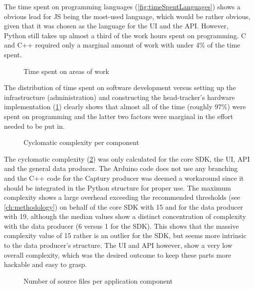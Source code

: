 The time spent on programming languages (\ref{fig:timeSpentLanguages}) shows a obvious lead for \ac{JS} being the most-used language, which would be rather obvious, given that it was chosen as the language for the \ac{UI} and the \ac{API}. However, Python still takes up almost a third of the work hours spent on programming. C and C++ required only a marginal amount of work with under 4\% of the time spent.

\begin{figure}[h]
\centering

\caption[Time spent on areas of work]{Time spent on areas of work\protect}
\label{fig:timeSpentTypeOfWork}
\end{figure}

The distribution of time spent on software development versus setting up the infrastructure (administration) and constructing the head-tracker's hardware implementation (\ref{fig:timeSpentTypeOfWork}) clearly shows that almost all of the time (roughly 97\%) were spent on programming and the latter two factors were marginal in the effort needed to be put in.

\begin{figure}[h]
\centering

\caption[Cyclomatic complexity]{Cyclomatic complexity per component\protect}
\label{fig:cyclomaticComplexity}
\end{figure}

The cyclomatic complexity (\ref{fig:cyclomaticComplexity}) was only calculated for the core \ac{SDK}, the \ac{UI}, \ac{API} and the general data producer. The Arduino code does not use any branching and the C++ code for the Captury producer was deemed a workaround since it should be integrated in the Python structure for proper use. The maximum complexity shows a large overhead exceeding the recommended thresholds (see \autoref{ch:methodology}) on behalf of the core \ac{SDK} with 15 and for the data producer with 19, although the median values show a distinct concentration of complexity with the data producer (6 versus 1 for the \ac{SDK}). This shows that the massive complexity value of 15 rather is an outlier for the \ac{SDK}, but seems more intrinsic to the data producer's structure. The \ac{UI} and \ac{API} however, show a very low overall complexity, which was the desired outcome to keep these parts more hackable and easy to grasp.

\begin{figure}[h]
\centering

\caption[File count]{Number of source files per application component\protect}
\label{fig:fileCount}
\end{figure}

